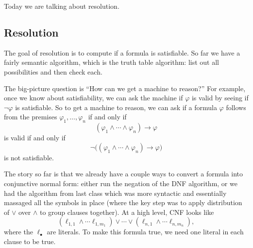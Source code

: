 
Today we are talking about resolution.

\subsection{Resolution}
The goal of resolution is to compute if a formula is satisfiable. So far we have a fairly semantic algorithm, which is the truth table algorithm: list out all possibilities and then check each.

The big-picture question is ``How can we get a machine to reason?'' For example, once we know about satisfiability, we can ask the machine if $\varphi$ is valid by seeing if $\lnot\varphi$ is satisfiable. So to get a machine to reason, we can ask if a formula $\varphi$ follows from the premises $\varphi_1,\ldots,\varphi_n$ if and only if
\[(\varphi_1\land\cdots\land\varphi_n)\to\varphi\]
is valid if and only if
\[\lnot\big((\varphi_1\land\cdots\land\varphi_n)\to\varphi\big)\]
is not satisfiable.

The story so far is that we already have a couple ways to convert a formula into conjunctive normal form: either run the negation of the DNF algorithm, or we had the algorithm from last class which was more syntactic and essentially massaged all the symbols in place (where the key step was to apply distribution of $\lor$ over $\land$ to group clauses together). At a high level, CNF looks like
\[(\ell_{1,1}\land\cdots\ell_{1,m_1})\lor\cdots\lor(\ell_{n,1}\land\cdots\ell_{n,m_n}),\]
where the $\ell_\bullet$ are literals. To make this formula true, we need one literal in each clause to be true.

